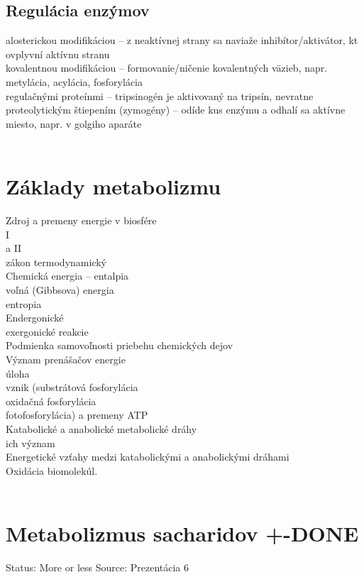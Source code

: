 \subsection*{Regulácia enzýmov}
alosterickou modifikáciou -- z neaktívnej strany sa naviaže inhibítor/aktivátor, kt ovplyvní aktívnu stranu\\
kovalentnou modifikáciou -- formovanie/ničenie kovalentných väzieb, napr. metylácia, acylácia, fosforylácia\\
regulačnými proteínmi -- tripsinogén je aktivovaný na tripsín, nevratne\\
proteolytickým štiepením (zymogény) -- odíde kus enzýmu a odhalí sa aktívne miesto, napr. v golgiho aparáte\\
\\
\section{Základy metabolizmu}
Zdroj a premeny energie v biosfére\\
I\\
a II\\
zákon termodynamický\\
Chemická energia -- entalpia\\
\tab voľná (Gibbsova) energia\\
\tab entropia\\
Endergonické\\
\tab exergonické reakcie\\
Podmienka samovoľnosti priebehu chemických dejov\\
Význam prenášačov energie\\
\tab úloha\\
\tab vznik (substrátová fosforylácia\\
\tab oxidačná fosforylácia\\
\tab fotofosforylácia) a premeny ATP\\
Katabolické a anabolické metabolické dráhy\\
\tab ich význam\\
Energetické vzťahy medzi katabolickými a anabolickými dráhami\\
Oxidácia biomolekúl.\\
\\
\section{Metabolizmus sacharidov +-DONE}

Status: More or less
Source: Prezentácia 6

